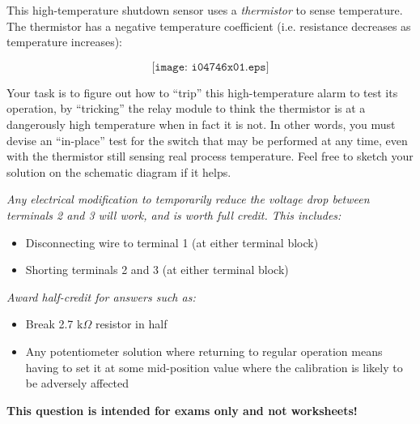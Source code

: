 

This high-temperature shutdown sensor uses a {\it thermistor} to sense temperature.  The thermistor has a negative temperature coefficient (i.e. resistance decreases as temperature increases):

$$\texttt{[image: i04746x01.eps]}$$

Your task is to figure out how to ``trip'' this high-temperature alarm to test its operation, by ``tricking'' the relay module to think the thermistor is at a dangerously high temperature when in fact it is not.  In other words, you must devise an ``in-place'' test for the switch that may be performed at any time, even with the thermistor still sensing real process temperature.  Feel free to sketch your solution on the schematic diagram if it helps.







{\it Any electrical modification to temporarily reduce the voltage drop between terminals 2 and 3 will work, and is worth full credit.  This includes:}

\begin{itemize}
\item{} Disconnecting wire to terminal 1 (at either terminal block)
\item{} Shorting terminals 2 and 3 (at either terminal block)
\end{itemize}

{\it Award half-credit for answers such as:}

\begin{itemize}
\item{} Break 2.7 k$\Omega$ resistor in half
\item{} Any potentiometer solution where returning to regular operation means having to set it at some mid-position value where the calibration is likely to be adversely affected
\end{itemize}







{\bf This question is intended for exams only and not worksheets!}



